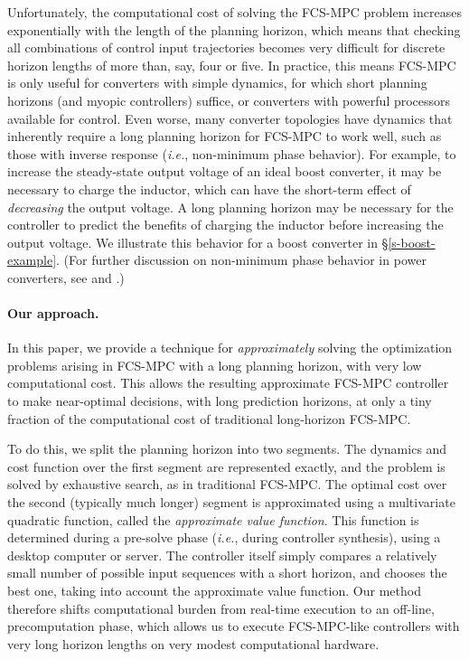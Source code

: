 \documentclass[12pt]{article}
\newcommand{\ie}{{\it i.e.}}
\begin{document}
Unfortunately, the computational cost of solving the FCS-MPC problem
increases exponentially with the length of the planning horizon,
which means that checking all combinations
of control input trajectories becomes very difficult
for discrete horizon lengths of more than, say, four or five.
In practice, this means FCS-MPC is only useful
for converters with simple dynamics,
for which short planning horizons (and myopic controllers) suffice,
or converters with powerful processors available for control.
Even worse, many converter topologies have dynamics
that inherently require a long planning horizon for FCS-MPC to work well,
such as those with inverse response (\ie, non-minimum phase behavior).
For example, to increase the steady-state output voltage of an ideal boost converter,
it may be necessary to charge the inductor,
which can have the short-term effect of \emph{decreasing} the
output voltage.
A long planning horizon may be necessary
for the controller to predict the benefits of charging the inductor
before increasing the output voltage.
We illustrate this behavior for a boost converter in \S \ref{s-boost-example}.
(For further discussion on non-minimum phase behavior in power converters,
see \cite[Ch. 9]{erickson2007fundamentals} and \cite{karamanakos2014direct}.)
 
\paragraph{Our approach.}
In this paper, 
we provide a technique for \emph{approximately} solving
the optimization problems arising in FCS-MPC
with a long planning horizon, with very low computational cost.
This allows the resulting approximate FCS-MPC controller to make 
near-optimal decisions, with long prediction horizons,
at only a tiny fraction of the computational cost of
traditional long-horizon FCS-MPC.


To do this, we split the planning horizon into two segments.
The dynamics and cost function over the first segment are represented exactly,
and the problem is solved by exhaustive search,
as in traditional FCS-MPC.
The optimal cost over the second (typically much longer) 
segment is approximated using 
a multivariate quadratic function,
called the \emph{approximate value function}.
This function is determined during a
pre-solve phase (\ie, during controller synthesis),
using a desktop computer or server.
The controller itself simply compares a relatively
small number of possible input sequences with a short horizon,
and chooses the best one, taking into account the approximate value function.
Our method therefore shifts computational burden from
real-time execution to an off-line, precomputation phase,
which allows us to execute FCS-MPC-like controllers 
with very long horizon lengths on very modest computational hardware.
\end{document}
